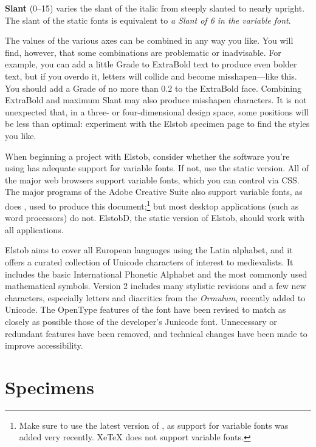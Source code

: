 \documentclass[12pt,letterpaper,openany]{book}
\begin{document}
\textbf{Slant} (0--15) varies
the slant of the italic from { steeply slanted} to { nearly upright}. The slant of the static fonts is
equivalent to \textit{a Slant of 6 in the variable font}.

The values of the various axes can be combined in any way you like. You will find,
however, that some combinations are problematic or inadvisable. For example,
you can add a little Grade to ExtraBold text to produce {\superbold even
bolder text}, but if you overdo it, letters will collide and become
misshapen---{\waytoobold like this}. You should add a Grade of no more than 0.2
to the ExtraBold face.
Combining ExtraBold and maximum Slant may also produce misshapen characters. It
is not unexpected that, in a three- or four-dimensional design space, some positions
will be less than optimal: experiment with the Elstob specimen page to find the
styles you like.

When beginning a project with Elstob, consider whether the software you’re using
has adequate support for variable fonts. If not, use the static version.
All of the major web browsers support variable fonts, which you can control via
CSS. The major programs of the Adobe Creative Suite also support variable fonts,
as does {\ltech}, used to produce this document;\footnote{Make sure to use the
latest version of {\ltech}, as support for variable fonts was added very
recently. XeTeX does not support variable fonts.} but most desktop applications
(such as word processors) do not. ElstobD, the static version of Elstob,
should work with all applications.

Elstob aims to cover all European languages using the Latin alphabet, and it offers
a curated collection of Unicode characters of interest to medievalists. It includes
the basic International Phonetic Alphabet and the most commonly used
mathematical symbols. Version 2 includes many stylistic revisions and a few new
characters, especially letters and diacritics from the \textit{Ormulum},
recently added to Unicode. The OpenType features of the font have been revised
to match as closely as possible those of the developer’s Junicode font.
Unnecessary or redundant features have been removed, and technical changes have
been made to improve accessibility.\pagebreak

\chapter{Specimens}
\end{document}
